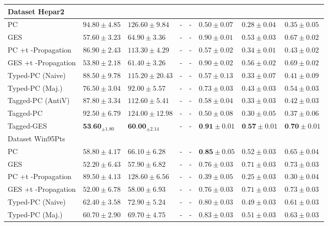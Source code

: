 \documentclass[10pt]{article}
\begin{document}
\begin{table}[h]
\begin{center}
\begin{tabular}{|l|l|l|l|l|l|l|l|}
\hline
Dataset Hepar2 & \multicolumn{7}{|c|}{} \\
\hline
PC & $94.80 \pm 4.85$ & $126.60 \pm 9.84$ & - & - & $0.50 \pm 0.07$ & $0.28 \pm 0.04$ & $0.35 \pm 0.05$ \\
\hline
GES & $57.60 \pm 3.23$ & $64.90 \pm 3.36$ & - & - & $0.90 \pm 0.01$ & $0.53 \pm 0.03$ & $0.67 \pm 0.02$ \\
\hline
PC +t -Propagation & $86.90 \pm 2.43$ & $113.30 \pm 4.29$ & - & - & $0.57 \pm 0.02$ & $0.34 \pm 0.01$ & $0.43 \pm 0.02$ \\
\hline
GES +t -Propagation & $53.80 \pm 2.18$ & $61.40 \pm 3.26$ & - & - & $0.90 \pm 0.02$ & $0.56 \pm 0.02$ & $0.69 \pm 0.02$ \\
\hline
Typed-PC (Naive) & $88.50 \pm 9.78$ & $115.20 \pm 20.43$ & - & - & $0.57 \pm 0.13$ & $0.33 \pm 0.07$ & $0.41 \pm 0.09$ \\
\hline
Typed-PC (Maj.) & $76.50 \pm 3.04$ & $92.00 \pm 5.57$ & - & - & $0.73 \pm 0.03$ & $0.43 \pm 0.03$ & $0.54 \pm 0.03$ \\
\hline
Tagged-PC (AntiV) & $87.80 \pm 3.34$ & $112.60 \pm 5.41$ & - & - & $0.58 \pm 0.04$ & $0.33 \pm 0.03$ & $0.42 \pm 0.03$ \\
\hline
Tagged-PC & $92.50 \pm 6.79$ & $124.00 \pm 12.98$ & - & - & $0.50 \pm 0.08$ & $0.30 \pm 0.05$ & $0.37 \pm 0.06$ \\
\hline
Tagged-GES & $\mathbf{5 3 . 6 0}_{ \pm 1.80}$ & $\mathbf{6 0 . 0 0}_{ \pm 2.14}$ & - & - & $\mathbf{0 . 9 1} \pm 0.01$ & $\mathbf{0 . 5 7} \pm 0.01$ & $\mathbf{0 . 7 0} \pm 0.01$ \\
\hline
Dataset Win95Pts & \multicolumn{7}{|c|}{} \\
\hline
PC & $58.80 \pm 4.17$ & $66.10 \pm 6.28$ & - & - & $\mathbf{0 . 8 5} \pm 0.05$ & $0.52 \pm 0.03$ & $0.65 \pm 0.04$ \\
\hline
GES & $52.20 \pm 6.43$ & $57.90 \pm 6.82$ & - & - & $0.76 \pm 0.03$ & $0.71 \pm 0.03$ & $0.73 \pm 0.03$ \\
\hline
PC +t -Propagation & $89.50 \pm 4.13$ & $128.60 \pm 6.56$ & - & - & $0.39 \pm 0.05$ & $0.25 \pm 0.03$ & $0.30 \pm 0.04$ \\
\hline
GES +t -Propagation & $52.00 \pm 6.78$ & $58.00 \pm 6.93$ & - & - & $0.76 \pm 0.03$ & $0.71 \pm 0.03$ & $0.73 \pm 0.03$ \\
\hline
Typed-PC (Naive) & $62.40 \pm 3.58$ & $72.90 \pm 5.24$ & - & - & $0.80 \pm 0.03$ & $0.49 \pm 0.03$ & $0.61 \pm 0.03$ \\
\hline
Typed-PC (Maj.) & $60.70 \pm 2.90$ & $69.70 \pm 4.75$ & - & - & $0.83 \pm 0.03$ & $0.51 \pm 0.03$ & $0.63 \pm 0.03$ \\

\end{tabular}
\end{center}
\end{table}
\end{document}
